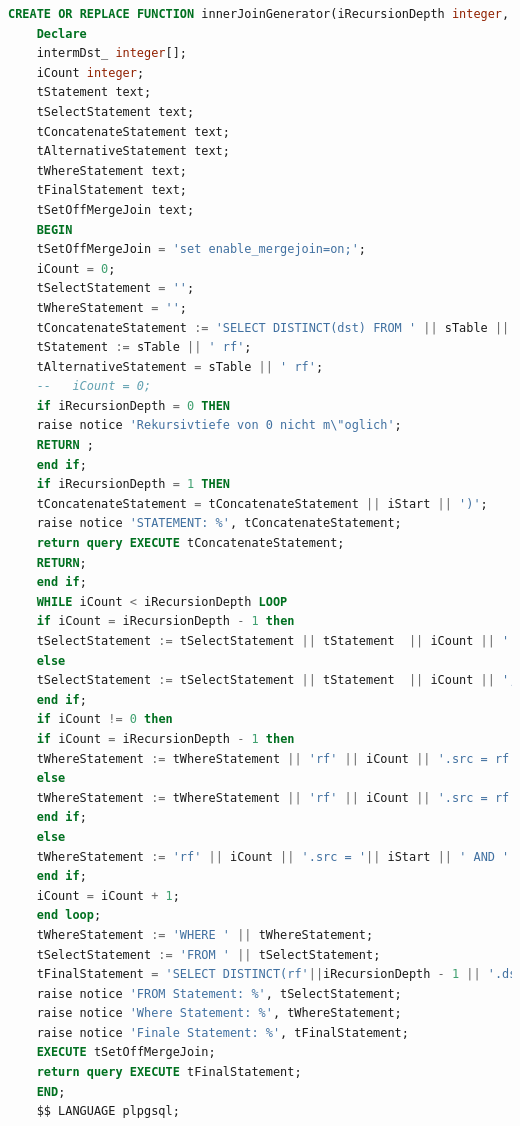\begin{lstlisting}[language=SQL,caption = innerJoinSourceCodeGenerator,frame=single, label={2.INNERJOINGENERATOR.listing} ]
    CREATE OR REPLACE FUNCTION innerJoinGenerator(iRecursionDepth integer, sTable text, iStart integer) RETURNS SETOF integer AS $$
    Declare
    intermDst_ integer[];
    iCount integer;
    tStatement text;
    tSelectStatement text;
    tConcatenateStatement text;
    tAlternativeStatement text;
    tWhereStatement text;
    tFinalStatement text;
    tSetOffMergeJoin text;
    BEGIN
    tSetOffMergeJoin = 'set enable_mergejoin=on;';
    iCount = 0;
    tSelectStatement = '';
    tWhereStatement = '';
    tConcatenateStatement := 'SELECT DISTINCT(dst) FROM ' || sTable || ' WHERE src IN(';
    tStatement := sTable || ' rf';
    tAlternativeStatement = sTable || ' rf';
    --   iCount = 0;
    if iRecursionDepth = 0 THEN
    raise notice 'Rekursivtiefe von 0 nicht m\"oglich';
    RETURN ;
    end if;
    if iRecursionDepth = 1 THEN
    tConcatenateStatement = tConcatenateStatement || iStart || ')';
    raise notice 'STATEMENT: %', tConcatenateStatement;
    return query EXECUTE tConcatenateStatement;
    RETURN;
    end if;
    WHILE iCount < iRecursionDepth LOOP
    if iCount = iRecursionDepth - 1 then
    tSelectStatement := tSelectStatement || tStatement  || iCount || ' ';
    else
    tSelectStatement := tSelectStatement || tStatement  || iCount || ', ';
    end if;
    if iCount != 0 then
    if iCount = iRecursionDepth - 1 then
    tWhereStatement := tWhereStatement || 'rf' || iCount || '.src = rf' || iCount - 1 || '.dst ';
    else
    tWhereStatement := tWhereStatement || 'rf' || iCount || '.src = rf' || iCount - 1 || '.dst AND ';
    end if;
    else
    tWhereStatement := 'rf' || iCount || '.src = '|| iStart || ' AND ' ;
    end if;
    iCount = iCount + 1;
    end loop;
    tWhereStatement := 'WHERE ' || tWhereStatement;
    tSelectStatement := 'FROM ' || tSelectStatement;
    tFinalStatement = 'SELECT DISTINCT(rf'||iRecursionDepth - 1 || '.dst) ' || tSelectStatement || tWhereStatement;
    raise notice 'FROM Statement: %', tSelectStatement;
    raise notice 'Where Statement: %', tWhereStatement;
    raise notice 'Finale Statement: %', tFinalStatement;
    EXECUTE tSetOffMergeJoin;
    return query EXECUTE tFinalStatement;
    END;
    $$ LANGUAGE plpgsql;
\end{lstlisting}

